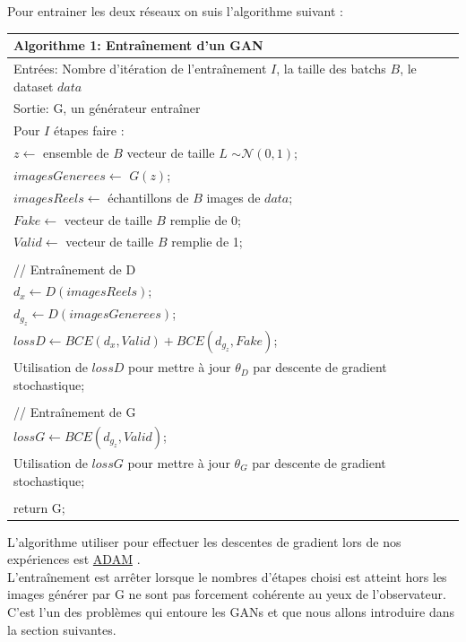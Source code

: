 \documentclass[11pt,francais]{article}
\begin{document}
Pour entrainer les deux réseaux on suis l'algorithme suivant :
\begin{table}[hb]
  \begin{tabular}{l}
  \hline
  Algorithme 1: Entraînement d'un GAN\tabularnewline
  \hline
  Entrées: Nombre d'itération de l'entraînement  \(I\), la taille des batchs \(B\), le dataset \(data\)  \tabularnewline
  Sortie: G, un générateur entraîner \tabularnewline
  \hline
  Pour \(I\) étapes faire :\tabularnewline 
  \hspace{1cm}\(z \leftarrow\) ensemble de \(B\) vecteur de taille \(L\) \(\sim \mathcal{N}(0,1)\);\tabularnewline
  \hspace{1cm}\(imagesGenerees \leftarrow\) \(G(z)\);\tabularnewline  
  \hspace{1cm}\(imagesReels \leftarrow\) échantillons de \(B\) images de \(data\);\tabularnewline
  \hspace{1cm}\(Fake \leftarrow\) vecteur de taille \(B\) remplie de 0;\tabularnewline
  \hspace{1cm}\(Valid \leftarrow\) vecteur de taille \(B\) remplie de 1;\tabularnewline
  \tabularnewline
  \hspace{1cm}// Entraînement de D\tabularnewline
  \hspace{1cm}\(d_x \leftarrow D(imagesReels)\);\tabularnewline
  \hspace{1cm}\(d_{g_z} \leftarrow D(imagesGenerees)\);\tabularnewline
  \hspace{1cm}\(lossD \leftarrow BCE(d_x,Valid) + BCE(d_{g_z},Fake)\);\tabularnewline
  \hspace{1cm}Utilisation de \(lossD\) pour mettre à jour \(\theta_D\) par descente de gradient stochastique;\tabularnewline
  \tabularnewline
  \hspace{1cm}// Entraînement de G\tabularnewline
  \hspace{1cm}\(lossG\leftarrow BCE(d_{g_z},Valid)\);\tabularnewline
  \hspace{1cm}Utilisation de \(lossG\) pour mettre à jour \(\theta_G\) par descente de gradient stochastique;\tabularnewline
  \tabularnewline
  return G;\tabularnewline
  \hline
  \end{tabular}
  \label{tab:tab1}
\end{table}

L'algorithme utiliser pour effectuer les descentes de gradient lors de nos expériences est \href{https://arxiv.org/pdf/1412.6980.pdf}{ADAM} \cite{kingma2014adam}.\\
L'entraînement est arrêter lorsque le nombres d'étapes choisi est atteint hors les images générer par G ne sont pas forcement cohérente au yeux de l'observateur. C'est l'un des problèmes qui entoure les GANs et que nous allons introduire dans la section suivantes.
\end{document}
